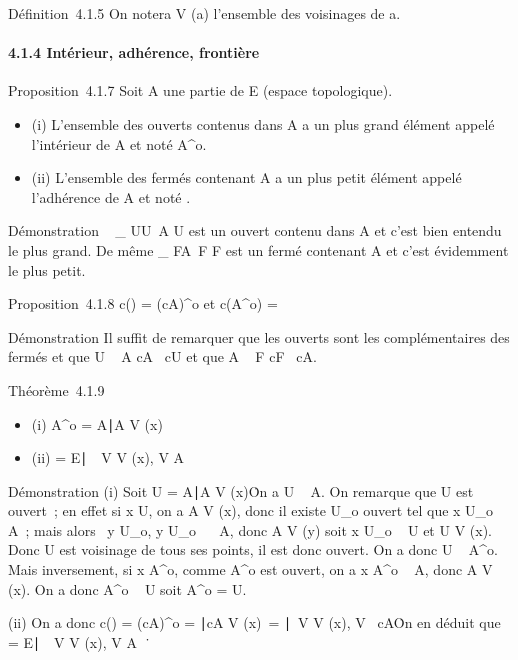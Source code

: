 \documentclass[]{article}
\begin{document}
Définition~4.1.5 On notera V (a) l'ensemble des voisinages de a.

\paragraph{4.1.4 Intérieur, adhérence, frontière}

Proposition~4.1.7 Soit A une partie de E (espace topologique).

\begin{itemize}
\itemsep1pt\parskip0pt
\item
  (i) L'ensemble des ouverts contenus dans A a un plus grand élément
  appelé l'intérieur de A et noté A^o.
\item
  (ii) L'ensemble des fermés contenant A a un plus petit élément appelé
  l'adhérence de A et noté \overlineA.
\end{itemize}

Démonstration \⋃ ~
_ U\textouvert \atop U\subset~A U
est un ouvert contenu dans A et c'est bien entendu le plus grand. De
même \⋂  _
F \atop A\subset~F F est un
fermé contenant A et c'est évidemment le plus petit.

Proposition~4.1.8 c(\overlineA) = (cA)^o
et c(A^o) = \overlinecA

Démonstration Il suffit de remarquer que les ouverts sont les
complémentaires des fermés et que U \subset~ A \Leftrightarrow cA
\subset~cU et que A \subset~ F \Leftrightarrow cF \subset~cA.

Théorème~4.1.9

\begin{itemize}
\itemsep1pt\parskip0pt
\item
  (i) A^o = \x \in
  A∣A \in V (x)\
\item
  (ii) \overlineA = \x \in
  E∣\forall~~V \in V (x), V \bigcap
  A\neq~\varnothing~\
\end{itemize}

Démonstration (i) Soit U = \x \in
A∣A \in V (x)\. On a U \subset~ A. On
remarque que U est ouvert~; en effet si x \in U, on a A \in V (x), donc il
existe U_o ouvert tel que x \in U_o \subset~ A~; mais alors
\forall~y \in U_o, y \in U_o~ \subset~ A, donc
A \in V (y) soit x \in U_o \subset~ U et U \in V (x). Donc U est voisinage
de tous ses points, il est donc ouvert. On a donc U \subset~ A^o.
Mais inversement, si x \in A^o, comme A^o est
ouvert, on a x \in A^o \subset~ A, donc A \in V (x). On a donc
A^o \subset~ U soit A^o = U.

(ii) On a donc c(\overlineA) = (cA)^o =
\x∣cA \in V
(x)\ =
\x∣\exists~V
\in V (x), V \subset~cA\. On en déduit que
\overlineA = \x \in
E∣\forall~~V \in V (x), V \bigcap
A\neq~\varnothing~\.
\end{document}
